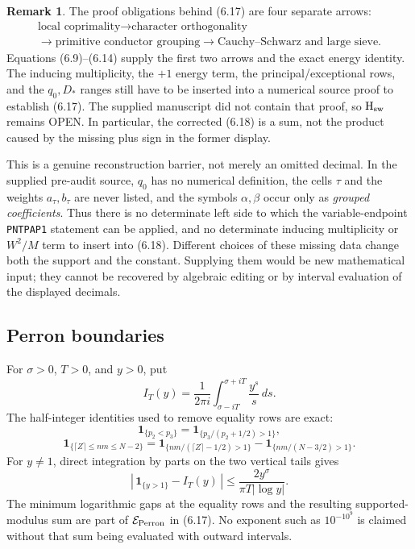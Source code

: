 \documentclass[11pt]{article}
\theoremstyle{definition}
\newtheorem{remark}[theorem]{Remark}
\newcommand{\openstatus}{\textcolor{red!75!black}{OPEN}}
\begin{document}
\begin{remark}
The proof obligations behind (6.17) are four separate arrows:
\[
\begin{gathered}
\text{local coprimality}
\longrightarrow\text{character orthogonality}\\
\longrightarrow\text{primitive conductor grouping}
\longrightarrow\text{Cauchy--Schwarz and large sieve}.
\end{gathered}
\]
Equations (6.9)--(6.14) supply the first two arrows and the exact energy
identity.  The inducing multiplicity, the \(+1\) energy term, the
principal/exceptional rows, and the \(q_0,D_*\) ranges still have to be
inserted into a numerical source proof to establish (6.17).  The supplied
manuscript did not contain that proof, so \(\mathrm{H}_{\rm sw}\) remains
\openstatus.  In particular, the corrected (6.18) is a sum, not the
product caused by the missing plus sign in the former display.

This is a genuine reconstruction barrier, not merely an omitted decimal.
In the supplied pre-audit source, \(q_0\) has no numerical definition,
the cells \(\tau\) and the weights \(a_\tau,b_\tau\) are never listed, and
the symbols \(\alpha,\beta\) occur only as \emph{grouped coefficients}.
Thus there is no determinate left side to which the variable-endpoint
\texttt{PNTPAP1} statement can be applied, and no determinate inducing
multiplicity or \(W^2/M\) term to insert into (6.18).  Different choices
of these missing data change both the support and the constant.  Supplying
them would be new mathematical input; they cannot be recovered by
algebraic editing or by interval evaluation of the displayed decimals.
\end{remark}

\subsection{Perron boundaries}
\label{sec:perron}

For \(\sigma>0\), \(T>0\), and \(y>0\), put
\[
 I_T(y)=\frac1{2\pi i}\int_{\sigma-iT}^{\sigma+iT}\frac{y^s}{s}\,ds.
\]
The half-integer identities used to remove equality rows are exact:
\[
 \mathbf1_{\{p_2<p_3\}}
 =\mathbf1_{\{p_3/(p_2+1/2)>1\}},
\tag{6.19}
\]
\[
 \mathbf1_{\{\lceil Z\rceil\le nm\le N-2\}}
 =
 \mathbf1_{\{nm/(\lceil Z\rceil-1/2)>1\}}
 -\mathbf1_{\{nm/(N-3/2)>1\}}.
\tag{6.20}
\]
For \(y\ne1\), direct integration by parts on the two vertical tails gives
\[
 |\,\mathbf1_{\{y>1\}}-I_T(y)\,|
 \le \frac{2y^\sigma}{\pi T|\log y|}.
\tag{6.21}
\]
The minimum logarithmic gaps at the equality rows and the resulting
supported-modulus sum are part of \(\mathcal E_{\rm Perron}\) in (6.17).
No exponent such as \(10^{-10^9}\) is claimed without that sum being
evaluated with outward intervals.
\end{document}
